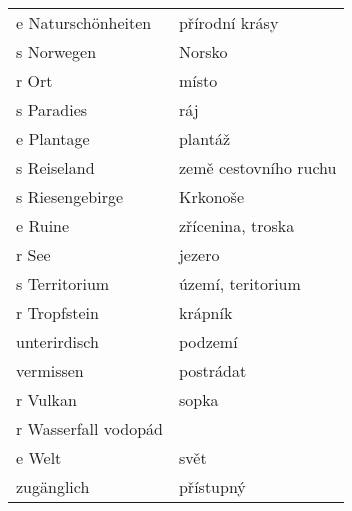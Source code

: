 \documentclass{article}
\begin{document}
\begin{tabular}{ p{5cm}|p{5cm}  }
    e Naturschönheiten & přírodní krásy\\
    s Norwegen & Norsko\\
    r Ort & místo\\
    s Paradies & ráj\\
    e Plantage & plantáž\\
    s Reiseland & země cestovního ruchu\\
    s Riesengebirge & Krkonoše\\
    e Ruine & zřícenina, troska\\
    r See & jezero\\
    s Territorium & území, teritorium\\
    r Tropfstein & krápník\\
    unterirdisch & podzemí\\
    vermissen & postrádat\\
    r Vulkan & sopka\\
    r Wasserfall vodopád\\
    e Welt & svět\\
    zugänglich & přístupný\\
\end{tabular}
\end{document}
